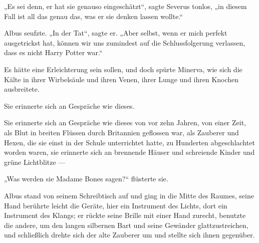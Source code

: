 „Es sei denn, er hat sie genauso eingeschätzt“, sagte Severus tonlos, „in diesem Fall ist all das genau das, was er sie denken lassen wollte.“

Albus seufzte.
„In der Tat“, sagte er.
„Aber selbst, wenn er mich perfekt ausgetrickst hat, können wir uns zumindest auf die Schlussfolgerung verlassen, dass es nicht Harry Potter war.“

Es hätte eine Erleichterung sein sollen, und doch spürte Minerva, wie sich die Kälte in ihrer Wirbelsäule und ihren Venen, ihrer Lunge und ihren Knochen ausbreitete.

Sie erinnerte sich an Gespräche wie dieses.

Sie erinnerte sich an Gespräche wie dieses von vor zehn Jahren, von einer Zeit, als Blut in breiten Flüssen durch Britannien geflossen war, als Zauberer und Hexen, die sie einst in der Schule unterrichtet hatte, zu Hunderten abgeschlachtet worden waren, sie erinnerte sich an brennende Häuser und schreiende Kinder und grüne Lichtblitze —

„Was werden sie Madame Bones sagen?“ flüsterte sie.

Albus stand von seinem Schreibtisch auf und ging in die Mitte des Raumes, seine Hand berührte leicht die Geräte, hier ein Instrument des Lichts, dort ein Instrument des Klangs; er rückte seine Brille mit einer Hand zurecht, benutzte die andere, um den langen silbernen Bart und seine Gewänder glattzustreichen, und schließlich drehte sich der alte Zauberer um und stellte sich ihnen gegenüber.

